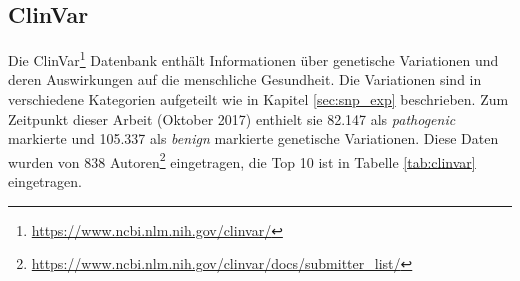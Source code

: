 \subsection{ClinVar}
\label{sec:clinvar}

Die ClinVar\footnote{\url{https://www.ncbi.nlm.nih.gov/clinvar/}} Datenbank enthält Informationen über genetische Variationen und deren Auswirkungen auf die menschliche Gesundheit. Die Variationen sind in verschiedene Kategorien aufgeteilt wie in Kapitel \ref{sec:snp_exp} beschrieben. Zum Zeitpunkt dieser Arbeit (Oktober 2017) enthielt sie 82.147 als \emph{pathogenic} markierte und 105.337 als \emph{benign} markierte genetische Variationen. Diese Daten wurden von 838 Autoren\footnote{\url{https://www.ncbi.nlm.nih.gov/clinvar/docs/submitter_list/}} eingetragen, die Top 10 ist in Tabelle \ref{tab:clinvar} eingetragen.

\begin{table}[]
    \centering
    \caption{Dargestellt sind die Top 10 Autoren der ClinVar sortiert nach der Anzahl ihrer Beiträge in die Datenbank.}
    \label{tab:clinvar}
\end{table}

